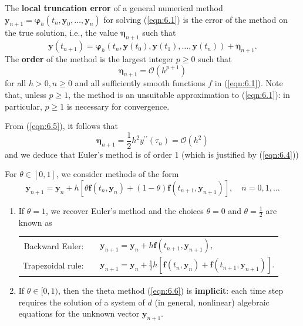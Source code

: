 \documentclass[a4paper]{article}
\begin{document}
\begin{definition}
    The \textbf{local truncation error} of a general numerical method $\mathbf{y}_{n+1}=\boldsymbol{\varphi}_h\left(t_n, \mathbf{y}_0, \ldots, \mathbf{y}_n\right)$ for solving (\ref{eqn:6.1}) is the error of the method on the true solution, i.e., the value $\boldsymbol{\eta}_{n+1}$ such that
\[
\mathbf{y}\left(t_{n+1}\right)=\boldsymbol{\varphi}_h\left(t_n, \mathbf{y}\left(t_0\right), \mathbf{y}\left(t_1\right), \ldots, \mathbf{y}\left(t_n\right)\right)+\mathbf{\boldsymbol{\eta}}_{n+1} .
\]
The \textbf{order} of the method is the largest integer $p \geq 0$ such that
\[
\boldsymbol{\eta}_{n+1}=\mathcal{O}\left(h^{p+1}\right)
\]
for all $h>0, n \geq 0$ and all sufficiently smooth functions $f$ in (\ref{eqn:6.1}). Note that, unless $p \geq 1$, the method is an unsuitable approximation to (\ref{eqn:6.1}): in particular, $p \geq 1$ is necessary for convergence.
\end{definition}

\begin{remark}
    From (\ref{eqn:6.5}), it follows that
\[
\boldsymbol{\eta}_{n+1}=\frac{1}{2} h^2 y^{\prime \prime}\left(\tau_n\right)=\mathcal{O}\left(h^2\right)
\]
and we deduce that Euler's method is of order 1 (which is justified by (\ref{eqn:6.4}))
\end{remark}

\begin{definition}
    For $\theta \in[0,1]$, we consider methods of the form
\begin{equation}\label{eqn:6.6}
    \mathbf{y}_{n+1}=\mathbf{y}_n+h\left[\theta \mathbf{f}\left(t_n, \mathbf{y}_n\right)+(1-\theta) \mathbf{f}\left(t_{n+1}, \mathbf{y}_{n+1}\right)\right], \quad n=0,1, \ldots
\end{equation}
\begin{enumerate}[(1)]
    \item If $\theta=1$, we recover Euler's method and the choices $\theta=0$ and $\theta=\frac{1}{2}$ are known as
    \begin{center}
    \begin{tabular}{rl}
        Backward Euler: & $\quad \mathbf{y}_{n+1}=\mathbf{y}_n+h \mathbf{f}\left(t_{n+1}, \mathbf{y}_{n+1}\right)$,\\[.5em]
        Trapezoidal rule: & $\quad \mathbf{y}_{n+1}=\mathbf{y}_n+\frac{1}{2} h\left[\mathbf{f}\left(t_n, \mathbf{y}_n\right)+\mathbf{f}\left(t_{n+1}, \mathbf{y}_{n+1}\right)\right]$.
    \end{tabular}
    \end{center}
    \item If $\theta \in[0,1)$, then the theta method (\ref{eqn:6.6}) is \textbf{implicit}: each time step requires the solution of a system of $d$ (in general, nonlinear) algebraic equations for the unknown vector $\mathbf{y}_{n+1}$.
\end{enumerate}
\end{definition}
\end{document}
